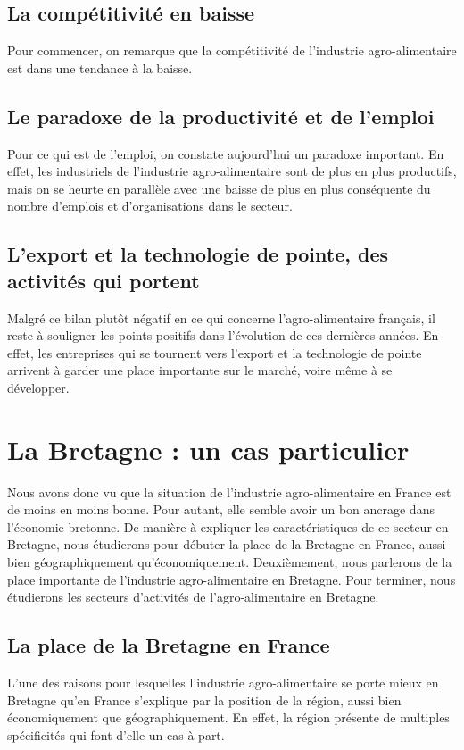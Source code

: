 \documentclass[a4paper,10pt]{report}
\begin{document}
		\subsection{La compétitivité en baisse}
			Pour commencer, on remarque que la compétitivité de l’industrie agro-alimentaire est dans une tendance à la baisse.

		\subsection{Le paradoxe de la productivité et de l'emploi}
			Pour ce qui est de l’emploi, on constate aujourd’hui un paradoxe important. En effet, les industriels de l’industrie agro-alimentaire sont de plus en plus productifs, mais on se heurte en parallèle avec une baisse de plus en plus conséquente du nombre d’emplois et d’organisations dans le secteur.

		\subsection{L'export et la technologie de pointe, des activités qui portent}
			Malgré ce bilan plutôt négatif en ce qui concerne l’agro-alimentaire français, il reste à souligner les points positifs dans l’évolution de ces dernières années. En effet, les entreprises qui se tournent vers l’export et la technologie de pointe arrivent à garder une place importante sur le marché, voire même à se développer.

	\section{La Bretagne : un cas particulier}
	Nous avons donc vu que la situation de l’industrie agro-alimentaire en France est de moins en moins bonne. Pour autant, elle semble avoir un bon ancrage dans l’économie bretonne. De manière à expliquer les caractéristiques de ce secteur en Bretagne, nous étudierons pour débuter la place de la Bretagne en France, aussi bien géographiquement qu’économiquement. Deuxièmement, nous parlerons de la place importante de l’industrie agro-alimentaire en Bretagne. Pour terminer, nous étudierons les secteurs d’activités de l’agro-alimentaire en Bretagne.

		\subsection{La place de la Bretagne en France}
			L’une des raisons pour lesquelles l’industrie agro-alimentaire se porte mieux en Bretagne qu’en France s’explique par la position de la région, aussi bien économiquement que géographiquement. En effet, la région présente de multiples spécificités qui font d’elle un cas à part.
	
\end{document}
